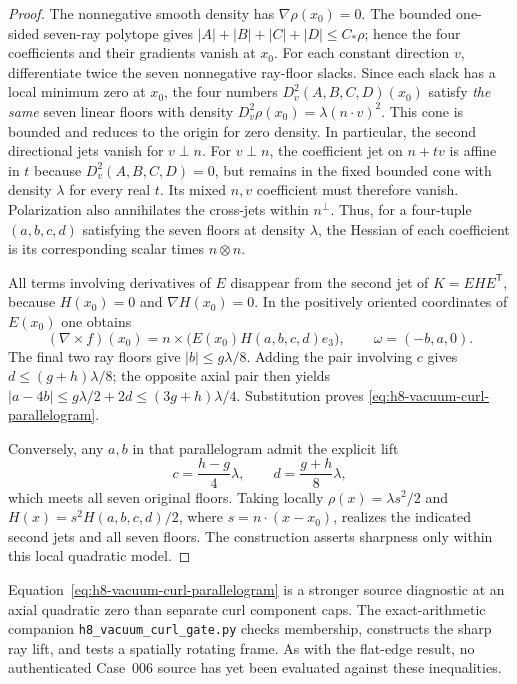 \documentclass[11pt,a4paper]{article}
\theoremstyle{plain}
\theoremstyle{definition}
\begin{document}
\begin{proof}
The nonnegative smooth density has $\nabla\rho(x_0)=0$.
The bounded one-sided seven-ray polytope gives
$|A|+|B|+|C|+|D|\le C_*\rho$; hence the four coefficients and
their gradients vanish at $x_0$. For each constant direction $v$,
differentiate twice the seven nonnegative ray-floor slacks.
Since each slack has a local minimum zero at $x_0$, the four
numbers $D_v^2(A,B,C,D)(x_0)$ satisfy \emph{the same} seven
linear floors with density $D_v^2\rho(x_0)=\lambda(n\cdot v)^2$.
This cone is bounded and reduces to the origin for zero density.
In particular, the second directional jets vanish for $v\perp n$.
For $v\perp n$, the coefficient jet on $n+tv$ is affine in $t$
because $D_v^2(A,B,C,D)=0$, but remains in the fixed bounded
cone with density $\lambda$ for every real $t$. Its mixed
$n,v$ coefficient must therefore vanish. Polarization also
annihilates the cross-jets within $n^\perp$. Thus, for a
four-tuple $(a,b,c,d)$ satisfying the seven floors at density
$\lambda$, the Hessian of each coefficient is its corresponding
scalar times $n\otimes n$.

All terms involving derivatives of $E$ disappear from the second
jet of $K=EHE^{\mathsf T}$, because $H(x_0)=0$ and
$\nabla H(x_0)=0$. In the positively oriented coordinates of
$E(x_0)$ one obtains
\[
 (\nabla\times f)(x_0)
 =n\times\bigl(E(x_0)H(a,b,c,d)e_3\bigr),
 \qquad \omega=(-b,a,0).
\]
The final two ray floors give $|b|\le g\lambda/8$.
Adding the pair involving $c$ gives
$d\le(g+h)\lambda/8$; the opposite axial pair then yields
$|a-4b|\le g\lambda/2+2d\le(3g+h)\lambda/4$.
Substitution proves \eqref{eq:h8-vacuum-curl-parallelogram}.

Conversely, any $a,b$ in that parallelogram admit the explicit
lift
\[
 c=\frac{h-g}{4}\lambda,
 \qquad d=\frac{g+h}{8}\lambda,
\]
which meets all seven original floors. Taking locally
$\rho(x)=\lambda s^2/2$ and
$H(x)=s^2 H(a,b,c,d)/2$, where $s=n\cdot(x-x_0)$,
realizes the indicated second jets and all seven floors.
The construction asserts sharpness only within this local
quadratic model.
\end{proof}

Equation~\eqref{eq:h8-vacuum-curl-parallelogram} is a stronger
source diagnostic at an axial quadratic zero than separate curl
component caps. The exact-arithmetic companion
\texttt{h8\_vacuum\_curl\_gate.py} checks membership, constructs
the sharp ray lift, and tests a spatially rotating frame.
As with the flat-edge result, no authenticated Case~006 source
has yet been evaluated against these inequalities.
\end{document}
